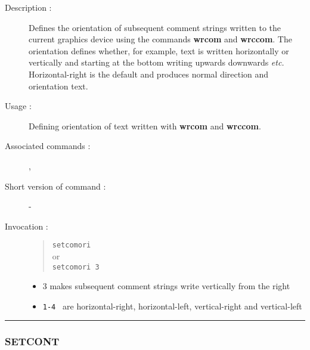 \begin{description}

\item[Description :] Defines the orientation of subsequent comment
strings written to the current graphics device using the commands {\bf
wrcom} and {\bf wrccom}.  The orientation defines whether, for example,
text is written horizontally or vertically and starting at the bottom
writing upwards downwards \emph{etc.} Horizontal-right is the default
and produces normal direction and orientation text.

\item[Usage :] Defining orientation of text written with {\bf wrcom} and
{\bf wrccom}.

\item[Associated commands :] {\tt {}},
{\tt {}}

\item[Short version of command :] -
\item[Invocation :]

\begin{quote}{\tt  setcomori }\\
or \\
{\tt setcomori 3 }
\end{quote}

\begin{itemize}

\item 3 makes subsequent comment strings write vertically from
 the right
\item {\tt 1-4 } are horizontal-right, horizontal-left, vertical-right
 and vertical-left
\end{itemize}

\end{description}

\hrule
\subsubsection*{\label{SETCONT}SETCONT}

